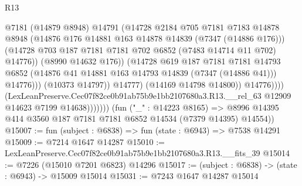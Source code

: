 \begin{lexlean}{R13}
\begin{coremodule}
                                      @7181
                                      (@14879 @8948)
                                      @14791
                                      (@14728
                                        @2184
                                        @705
                                        @7181
                                        @7183
                                        @14878
                                        @8948
                                        (@14876
                                          @176
                                          @14881
                                          @163
                                          @14878
                                          @14839
                                          (@7347 (@14886 @176)))
                                        (@14728
                                          @703
                                          @187
                                          @7181
                                          @7181
                                          @702
                                          @6852
                                          (@7483 @14714 @11 @702)
                                          @14776))
                                      (@8990 @14632 @176))
                                    (@14728
                                      @619
                                      @187
                                      @7181
                                      @7181
                                      @14793
                                      @6852
                                      (@14876 @41 @14881 @163 @14793 @14839 (@7347 (@14886 @41)))
                                      @14776)))
                                (@10373 @14797))
                              @14777)
                            (@14169 @14798 @14800))
                          @14776))))
                  (LexLeanPreserve.Cec07f82ce0b91ab75b9e1bb2107680a3.R13.__rel_63
                    @12909
                    @14623
                    @7199
                    @14638)))))))
      (fun ("_" : @14223 @8165) =>
      @8996 @14395 @414 @3560 @187 @7181 @7181 @6852 @14534 (@7379 @14395) @14554))
@15007 := fun (subject : @6838) => fun (state : @6943) => @7538 @14291
@15009 := @7214 @1647 @14287
@15010 := LexLeanPreserve.Cec07f82ce0b91ab75b9e1bb2107680a3.R13.__fits_39
@15014 := @7226 (@15010 @7201 @6823) @14296
@15017 := (subject : @6838) -> (state : @6943) -> @15009 @15014
@15031 := @7243
    @1647
    @14287
    @15014

\end{coremodule}
\end{lexlean}

